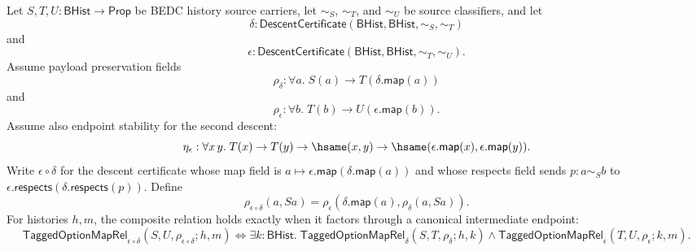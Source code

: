\begin{theorem}
\label{thm:tagged-option-payload-descent-composition-exactness}
Let $S,T,U:\mathsf{BHist}\to\mathsf{Prop}$ be BEDC history source carriers,
let $\sim_S$, $\sim_T$, and $\sim_U$ be source classifiers, and let
$$
\delta:\mathsf{DescentCertificate}(\mathsf{BHist},\mathsf{BHist},\sim_S,\sim_T)
$$
and
$$
\epsilon:\mathsf{DescentCertificate}(\mathsf{BHist},\mathsf{BHist},\sim_T,\sim_U).
$$
Assume payload preservation fields
$$
\rho_{\delta}:\forall a.\;S(a)\to T(\delta.\mathsf{map}(a))
$$
and
$$
\rho_{\epsilon}:\forall b.\;T(b)\to U(\epsilon.\mathsf{map}(b)).
$$
Assume also endpoint stability for the second descent:
$$
\eta_{\epsilon}:\forall x\,y.\;
T(x)\to T(y)\to \hsame(x,y)\to
\hsame(\epsilon.\mathsf{map}(x),\epsilon.\mathsf{map}(y)).
$$
Write $\epsilon\circ\delta$ for the descent certificate whose map field is
$a\mapsto\epsilon.\mathsf{map}(\delta.\mathsf{map}(a))$ and whose respects field
sends $p:a\sim_S b$ to
$\epsilon.\mathsf{respects}(\delta.\mathsf{respects}(p))$. Define
$$
\rho_{\epsilon\circ\delta}(a,Sa)=
\rho_{\epsilon}(\delta.\mathsf{map}(a),\rho_{\delta}(a,Sa)).
$$
For histories $h,m$, the composite relation holds exactly when it factors
through a canonical intermediate endpoint:
$$
\mathsf{TaggedOptionMapRel}_{\epsilon\circ\delta}
(S,U,\rho_{\epsilon\circ\delta};h,m)
\Longleftrightarrow
\exists k:\mathsf{BHist}.\;
\mathsf{TaggedOptionMapRel}_{\delta}(S,T,\rho_{\delta};h,k)\land
\mathsf{TaggedOptionMapRel}_{\epsilon}(T,U,\rho_{\epsilon};k,m).
$$
\end{theorem}
